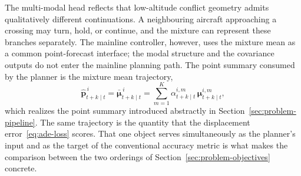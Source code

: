 \documentclass[11pt]{article}
\theoremstyle{plain}
\theoremstyle{definition}
\begin{document}
The multi-modal head reflects that low-altitude conflict geometry
admits qualitatively different continuations. A neighbouring aircraft
approaching a crossing may turn, hold, or continue, and the mixture
can represent these branches separately. The mainline controller,
however, uses the mixture mean as a common point-forecast interface;
the modal structure and the covariance outputs do not enter the
mainline planning path. The point summary consumed by the planner is
the mixture mean trajectory,
\begin{equation}
	\label{eq:mean-traj}
	\hat{\bm{p}}^{\,i}_{t+k \mid t}
	= \bar{\bm{\mu}}^{\,i}_{t+k \mid t}
	= \sum_{m=1}^{K} \alpha^{i,m}_{t+k \mid t}\,
	\bm{\mu}^{i,m}_{t+k \mid t},
\end{equation}
which realizes the point summary introduced abstractly in
Section~\ref{sec:problem-pipeline}. The same trajectory is the
quantity that the displacement error~\eqref{eq:ade-loss} scores. That
one object serves simultaneously as the planner's input and as the
target of the conventional accuracy metric is what makes the
comparison between the two orderings of
Section~\ref{sec:problem-objectives} concrete.
 
\end{document}
